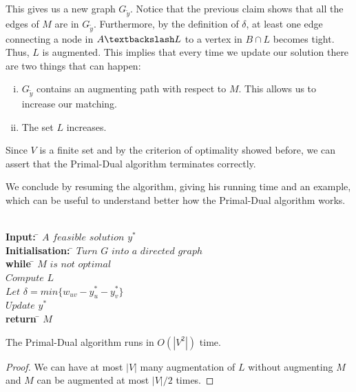 This gives us a new graph $G_{\tilde{y}}$. 
Notice that the previous claim shows that all the edges of $M$ 
are in $G_{\tilde{y}}$. 
Furthermore, by the definition of $\delta$, at least one edge 
connecting a node in $A \textbackslash L$ to a vertex in 
$B \cap L$ becomes tight. Thus, $L$ is augmented.
This implies that every time we update our solution there 
are two things that can happen:
\begin{enumerate}[i)]
   \item $G_{\tilde{y}}$ contains an augmenting path with respect 
         to $M$. This allows us to increase our matching.
   \item The set $L$ increases.
\end{enumerate}
Since $V$ is a finite set and by the criterion of optimality 
showed before, we can assert that the Primal-Dual algorithm 
terminates correctly.

We conclude by resuming the algorithm, giving his running time 
and an example, which can be useful to understand better how 
the Primal-Dual algorithm works.

\begin{algorithm}
  \begin{tabbing}
     \\
     {\bf Input:}           \= $A$ $feasible$ $solution$ $y^*$   \\
     {\bf Initialisation:}  \= $Turn$ $G$ $into$ $a$ $directed$ 
                               $graph$                           \\  
     {\bf while}            \= $M$ $is$ $not$ $optimal$          \\                               
                            \> $Compute$ $L$                     \\
                            \> $Let$ $\delta = min\{w_{uv}
                                - y^*_u - y^*_v\}$               \\
                            \>$Update$ $y^*$                     \\
     {\bf return}           \= $M$  
  \end{tabbing}
\end{algorithm}

\begin{theorem}
   The Primal-Dual algorithm runs in $O(|V^2|)$ time.
\end{theorem}

\begin{proof}
   We can have at most $|V|$ many augmentation of $L$ 
   without augmenting $M$ and $M$ can be augmented at most $|V| / 2$ 
   times. 
\end{proof}

